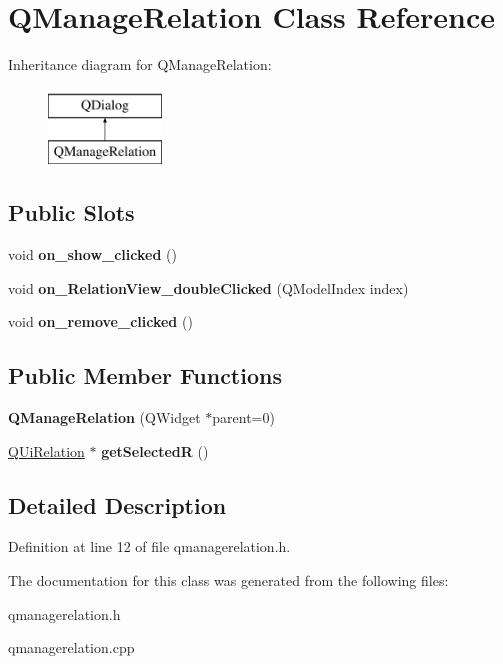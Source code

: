 \hypertarget{class_q_manage_relation}{}\section{Q\+Manage\+Relation Class Reference}
\label{class_q_manage_relation}
Inheritance diagram for Q\+Manage\+Relation\+:\begin{figure}[H]
\begin{center}
\leavevmode
\includegraphics[height=2.000000cm]{class_q_manage_relation}
\end{center}
\end{figure}
\subsection*{Public Slots}
\begin{DoxyCompactItemize}
\item 
\mbox{\label{class_q_manage_relation_aef7e40af43fa29fb5d8b325718897883}} 
void {\bfseries on\+\_\+show\+\_\+clicked} ()
\item 
\mbox{\label{class_q_manage_relation_a45a9416aa18e0d6729ef5d0f9c37e626}} 
void {\bfseries on\+\_\+\+Relation\+View\+\_\+double\+Clicked} (Q\+Model\+Index index)
\item 
\mbox{\label{class_q_manage_relation_a94a9a99974177cde7677f5c6ede78722}} 
void {\bfseries on\+\_\+remove\+\_\+clicked} ()
\end{DoxyCompactItemize}
\subsection*{Public Member Functions}
\begin{DoxyCompactItemize}
\item 
\mbox{\label{class_q_manage_relation_af470c7a01389927cd834432d4d37f5c9}} 
{\bfseries Q\+Manage\+Relation} (Q\+Widget $\ast$parent=0)
\item 
\mbox{\label{class_q_manage_relation_a28ec1f2567446d681dd20bfcf3c53a41}} 
\hyperlink{class_q_ui_relation}{Q\+Ui\+Relation} $\ast$ {\bfseries get\+SelectedR} ()
\end{DoxyCompactItemize}


\subsection{Detailed Description}


Definition at line 12 of file qmanagerelation.\+h.



The documentation for this class was generated from the following files\+:\begin{DoxyCompactItemize}
\item 
qmanagerelation.\+h\item 
qmanagerelation.\+cpp\end{DoxyCompactItemize}
